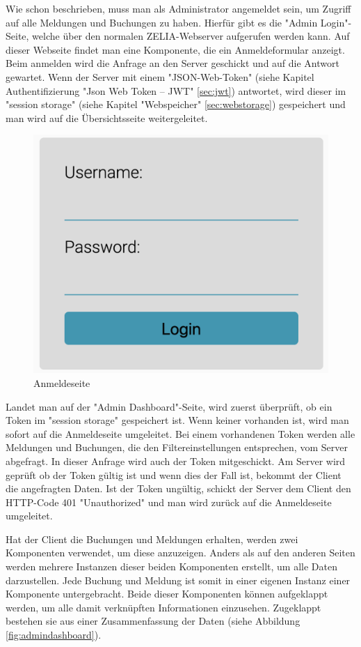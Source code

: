 Wie schon beschrieben, muss man als Administrator angemeldet sein, um Zugriff auf alle Meldungen und Buchungen zu haben. Hierfür gibt es die "Admin Login"-Seite, welche über den normalen ZELIA-Webserver aufgerufen werden kann. Auf dieser Webseite findet man eine Komponente, die ein Anmeldeformular anzeigt. Beim anmelden wird die Anfrage an den Server geschickt und auf die Antwort gewartet. Wenn der Server mit einem "JSON-Web-Token" (siehe Kapitel Authentifizierung "Json Web Token -- JWT" \ref{sec:jwt}) antwortet, wird dieser im "session storage" (siehe Kapitel "Webspeicher" \ref{sec:webstorage}) gespeichert und man wird auf die Übersichtsseite weitergeleitet.

\begin{figure}[H]
    \centering
    \includegraphics[width=120mm]{media/WebComponents/Login_light.png}
    \caption{Anmeldeseite}
\end{figure}

Landet man auf der "Admin Dashboard"-Seite, wird zuerst überprüft, ob ein Token im "session storage" gespeichert ist. Wenn keiner vorhanden ist, wird man sofort auf die Anmeldeseite umgeleitet. Bei einem vorhandenen Token werden alle Meldungen und Buchungen, die den Filtereinstellungen entsprechen, vom Server abgefragt. In dieser Anfrage wird auch der Token mitgeschickt. Am Server wird geprüft ob der Token gültig ist und wenn dies der Fall ist, bekommt der Client die angefragten Daten. Ist der Token ungültig, schickt der Server dem Client den HTTP-Code 401 "Unauthorized" und man wird zurück auf die Anmeldeseite umgeleitet.

Hat der Client die Buchungen und Meldungen erhalten, werden zwei Komponenten verwendet, um diese anzuzeigen. Anders als auf den anderen Seiten werden mehrere Instanzen dieser beiden Komponenten erstellt, um alle Daten darzustellen. Jede Buchung und Meldung ist somit in einer eigenen Instanz einer Komponente untergebracht. Beide dieser Komponenten können aufgeklappt werden, um alle damit verknüpften Informationen einzusehen. Zugeklappt bestehen sie aus einer Zusammenfassung der Daten (siehe Abbildung \ref{fig:admindashboard}).


